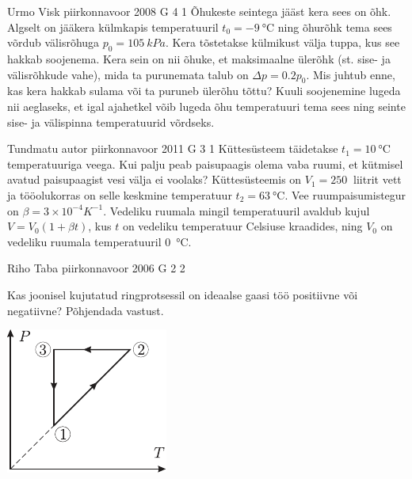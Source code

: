 \documentclass[11pt, twoside]{article}
\begin{document}
{%
{Urmo Visk} %
{piirkonnavoor} %
{2008} %
{G 4} %
{1} %
{
\ifStatement
Õhukeste seintega jääst kera sees on õhk. Algselt on jääkera külmkapis temperatuuril $t_0 = \SI{-9}{\celsius}$ ning õhurõhk tema sees võrdub välisrõhuga $p_0 = \SI{105}{kPa}$. Kera tõstetakse külmikust välja tuppa, kus see hakkab soojenema. Kera sein on nii õhuke, et maksimaalne ülerõhk (st. sise- ja välisrõhkude vahe), mida ta purunemata talub on $\Delta p = \num{0,2}p_0$. Mis juhtub enne, kas kera hakkab sulama või ta puruneb ülerõhu tõttu? Kuuli soojenemine lugeda nii aeglaseks, et igal ajahetkel võib lugeda õhu temperatuuri tema sees ning seinte sise- ja välispinna temperatuurid võrdseks.
\fi
}

{Tundmatu autor} %
{piirkonnavoor} %
{2011} %
{G 3} %
{1} %
{
\ifStatement
Küttesüsteem täidetakse $t_1=\SI{10}{\celsius}$ temperatuuriga veega. Kui palju peab paisupaagis olema vaba ruumi, et kütmisel avatud paisupaagist vesi välja ei voolaks? Küttesüsteemis on $V_1=\SI{250}{}$ liitrit vett ja tööolukorras on selle keskmine temperatuur $t_2=\SI{63}{\celsius}$. Vee ruumpaisumistegur on $\beta=3\times 10^{-4}K^{-1}$. Vedeliku ruumala mingil temperatuuril avaldub kujul $V=V_{0}(1+\beta t)$, kus $t$ on vedeliku temperatuur Celsiuse kraadides, ning $V_{0}$ on vedeliku ruumala temperatuuril \SI{0}{\celsius}.
\fi
}

{Riho Taba} %
{piirkonnavoor} %
{2006} %
{G 2} %
{2} %
{
\ifStatement
Kas joonisel kujutatud ringprotsessil on ideaalse gaasi töö positiivne või negatiivne? Põhjendada vastust.

\begin{center}
	\includegraphics[width=0.4\linewidth]{2006-v2g-02-yl}
\end{center}
\fi
}

}
\end{document}
